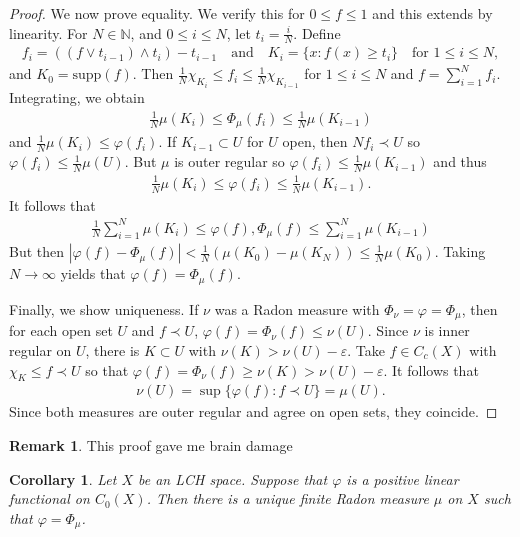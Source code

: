 \documentclass[11pt]{amsart}
\newtheorem{corollary}[theorem]{Corollary}
\theoremstyle{definition}
\newtheorem{remark}[theorem]{Remark}
\numberwithin{equation}{section}
\begin{document}
\begin{proof}
    We now prove equality. We verify this for $0\le f\le 1$ and this extends by linearity. For $N\in\mathbb N$, and $0\le i\le N$, let $t_i=\frac{i}{N}$. Define
    \begin{align*}
        f_i=((f\lor t_{i-1})\land t_i)-t_{i-1}\quad\text{and}\quad K_i=\{x:f(x)\ge t_i\}\quad\text{for }1\le i\le N,
    \end{align*}
    and $K_0=\mathrm{supp}(f)$. Then $\frac{1}{N}\chi_{K_i}\le f_i\le\frac{1}{N}\chi_{K_{i-1}}$ for $1\le i\le N$ and $f=\sum_{i=1}^Nf_i$. Integrating, we obtain
    \begin{align*}
        \frac{1}{N}\mu(K_i)\le\Phi_\mu(f_i)\le\frac{1}{N}\mu(K_{i-1})
    \end{align*}
    and $\frac{1}{N}\mu(K_i)\le\varphi(f_i)$. If $K_{i-1}\subset U$ for $U$ open, then $Nf_i\prec U$ so $\varphi(f_i)\le\frac{1}{N}\mu(U)$. But $\mu$ is outer regular so $\varphi(f_i)\le\frac{1}{N}\mu(K_{i-1})$ and thus
    \begin{align*}
        \frac{1}{N}\mu(K_i)\le\varphi(f_i)\le\frac{1}{N}\mu(K_{i-1}).
    \end{align*}
    It follows that
    \begin{align*}
        \frac{1}{N}\sum_{i=1}^N\mu(K_i)\le\varphi(f),\Phi_\mu(f)\le\sum_{i=1}^N\mu(K_{i-1})
    \end{align*}
    But then $|\varphi(f)-\Phi_\mu(f)|<\frac{1}{N}(\mu(K_0)-\mu(K_N))\le\frac{1}{N}\mu(K_0)$. Taking $N\to\infty$ yields that $\varphi(f)=\Phi_\mu(f)$.

    Finally, we show uniqueness. If $\nu$ was a Radon measure with $\Phi_\nu=\varphi=\Phi_\mu$, then for each open set $U$ and $f\prec U$, $\varphi(f)=\Phi_\nu(f)\le\nu(U)$. Since $\nu$ is inner regular on $U$, there is $K\subset U$ with $\nu(K)>\nu(U)-\varepsilon$. Take $f\in C_c(X)$ with $\chi_K\le f\prec U$ so that $\varphi(f)=\Phi_\nu(f)\ge\nu(K)>\nu(U)-\varepsilon$. It follows that
    \begin{align*}
        \nu(U)=\sup\{\varphi(f):f\prec U\}=\mu(U).
    \end{align*}
    Since both measures are outer regular and agree on open sets, they coincide.
\end{proof}
\begin{remark}
    This proof gave me brain damage
\end{remark}
\begin{corollary}
    Let $X$ be an LCH space. Suppose that $\varphi$ is a positive linear functional on $C_0(X)$. Then there is a unique finite Radon measure $\mu$ on $X$ such that $\varphi=\Phi_\mu$.
\end{corollary}
\end{document}
